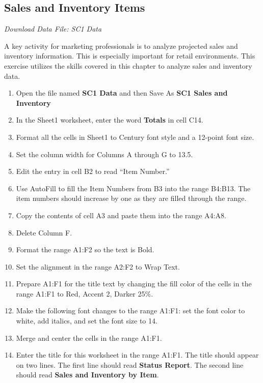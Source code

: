 \subsection{Sales and Inventory Items}

\textit{Download Data File: SC1 Data}

A key activity for marketing professionals is to analyze projected sales and inventory information. This is especially important for retail environments. This exercise utilizes the skills covered in this chapter to analyze sales and inventory data.

\begin{enumerate}
	\item Open the file named \textbf{SC1 Data} and then Save As \textbf{SC1 Sales and Inventory}
	\item In the Sheet1 worksheet, enter the word \textbf{Totals} in cell \textsf{C14}.
	\item Format all the cells in Sheet1 to Century font style and a 12-point font size.
	\item Set the column width for Columns \textsf{A} through \textsf{G} to 13.5.
	\item Edit the entry in cell \textsf{B2} to read ``Item Number.''
	\item Use AutoFill to fill the Item Numbers from \textsf{B3} into the range \textsf{B4:B13}. The item numbers should increase by one as they are filled through the range.
	\item Copy the contents of cell \textsf{A3} and paste them into the range \textsf{A4:A8}.
	\item Delete Column \textsf{F}.
	\item Format the range \textsf{A1:F2} so the text is Bold.
	\item Set the alignment in the range \textsf{A2:F2} to Wrap Text.
	\item Prepare \textsf{A1:F1} for the title text by changing the fill color of the cells in the range \textsf{A1:F1} to Red, Accent 2, Darker 25\%.
	\item Make the following font changes to the range \textsf{A1:F1}: set the font color to white, add italics, and set the font size to 14.
	\item Merge and center the cells in the range \textsf{A1:F1}.
	\item Enter the title for this worksheet in the range \textsf{A1:F1}. The title should appear on two lines. The first line should read \textbf{Status Report}. The second line should read \textbf{Sales and Inventory by Item}.

\end{enumerate}
